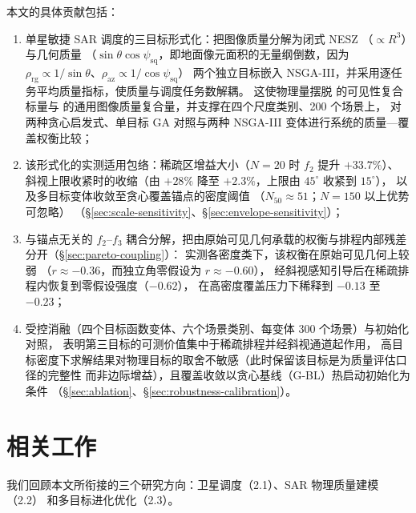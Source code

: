 \documentclass[preprint,12pt,authoryear]{elsarticle}
\begin{document}
本文的具体贡献包括：
\begin{enumerate}[nosep]
    \item 单星敏捷 SAR 调度的三目标形式化：把图像质量分解为闭式 NESZ
    （$\propto R^3$）与几何质量
    （$\sin\theta\cos\psi_{\text{sq}}$，即地面像元面积的无量纲倒数，因为
    $\rho_{\text{rg}} \propto 1/\sin\theta$、$\rho_{\text{az}} \propto 1/\cos\psi_{\text{sq}}$）
    两个独立目标嵌入 NSGA-III，并采用逐任务平均质量指标，使质量与调度任务数解耦。
    这使物理量摆脱 \citet{Kramer2025SARVis} 的可见性复合标量与 \citet{Wei2025MONP}
    的通用图像质量复合量，并支撑在四个尺度类别、200 个场景上，
    对两种贪心启发式、单目标 GA 对照与两种 NSGA-III 变体进行系统的质量—覆盖权衡比较；
    \item 该形式化的实测适用包络：稀疏区增益大小（$N=20$ 时 $f_2$ 提升 $+33.7\%$）、
    斜视上限收紧时的收缩（由 $+28\%$ 降至 $+2.3\%$，上限由 $45^\circ$ 收紧到 $15^\circ$），
    以及多目标变体收敛至贪心覆盖锚点的密度阈值
    （$N_{50} \approx 51$；$N=150$ 以上优势可忽略）
    （\S\ref{sec:scale-sensitivity}、\S\ref{sec:envelope-sensitivity}）；
    \item 与锚点无关的 $f_2$--$f_3$ 耦合分解，把由原始可见几何承载的权衡与排程内部残差分开（\S\ref{sec:pareto-coupling}）：
    实测各密度类下，该权衡在原始可见几何上较弱
    （$r \approx -0.36$，而独立角零假设为 $r \approx -0.60$），
    经斜视感知引导后在稀疏排程内恢复到零假设强度（$-0.62$），
    在高密度覆盖压力下稀释到 $-0.13$ 至 $-0.23$；
    \item 受控消融（四个目标函数变体、六个场景类别、每变体 300 个场景）与初始化对照，
    表明第三目标的可测价值集中于稀疏排程并经斜视通道起作用，
    高目标密度下求解结果对物理目标的取舍不敏感（此时保留该目标是为质量评估口径的完整性
    而非边际增益），且覆盖收敛以贪心基线（G-BL）热启动初始化为条件
    （\S\ref{sec:ablation}、\S\ref{sec:robustness-calibration}）。
\end{enumerate}
\section{相关工作}
我们回顾本文所衔接的三个研究方向：卫星调度（2.1）、SAR 物理质量建模（2.2）
和多目标进化优化（2.3）。
\end{document}
